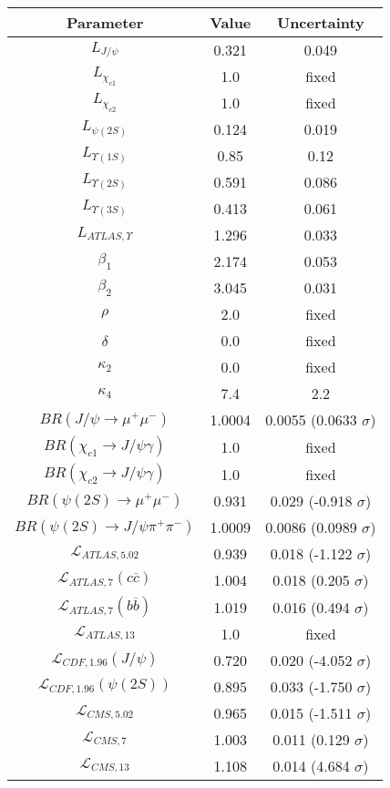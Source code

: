 \begin{table}[h!]
\centering
\begin{tabular}{c|c|c}
Parameter & Value & Uncertainty \\
\hline
$L_{J/\psi}$ & 0.321 & 0.049 \\
$L_{\chi_{c1}}$ & 1.0 & fixed \\
$L_{\chi_{c2}}$ & 1.0 & fixed \\
$L_{\psi(2S)}$ & 0.124 & 0.019 \\
$L_{\Upsilon(1S)}$ & 0.85 & 0.12 \\
$L_{\Upsilon(2S)}$ & 0.591 & 0.086 \\
$L_{\Upsilon(3S)}$ & 0.413 & 0.061 \\
$L_{ATLAS,\Upsilon}$ & 1.296 & 0.033 \\
$\beta_1$ & 2.174 & 0.053 \\
$\beta_2$ & 3.045 & 0.031 \\
$\rho$ & 2.0 & fixed \\
$\delta$ & 0.0 & fixed \\
$\kappa_2$ & 0.0 & fixed \\
$\kappa_4$ & 7.4 & 2.2 \\
$BR(J/\psi\rightarrow\mu^+\mu^-)$ & 1.0004 & 0.0055 (0.0633 $\sigma$) \\
$BR(\chi_{c1}\rightarrow J/\psi\gamma)$ & 1.0 & fixed \\
$BR(\chi_{c2}\rightarrow J/\psi\gamma)$ & 1.0 & fixed \\
$BR(\psi(2S)\rightarrow\mu^+\mu^-)$ & 0.931 & 0.029 (-0.918 $\sigma$) \\
$BR(\psi(2S)\rightarrow J/\psi\pi^+\pi^-)$ & 1.0009 & 0.0086 (0.0989 $\sigma$) \\
$\mathcal L_{ATLAS,5.02}$ & 0.939 & 0.018 (-1.122 $\sigma$) \\
$\mathcal L_{ATLAS,7}(c\overline c)$ & 1.004 & 0.018 (0.205 $\sigma$) \\
$\mathcal L_{ATLAS,7}(b\overline b)$ & 1.019 & 0.016 (0.494 $\sigma$) \\
$\mathcal L_{ATLAS,13}$ & 1.0 & fixed \\
$\mathcal L_{CDF,1.96}(J/\psi)$ & 0.720 & 0.020 (-4.052 $\sigma$) \\
$\mathcal L_{CDF,1.96}(\psi(2S))$ & 0.895 & 0.033 (-1.750 $\sigma$) \\
$\mathcal L_{CMS,5.02}$ & 0.965 & 0.015 (-1.511 $\sigma$) \\
$\mathcal L_{CMS,7}$ & 1.003 & 0.011 (0.129 $\sigma$) \\
$\mathcal L_{CMS,13}$ & 1.108 & 0.014 (4.684 $\sigma$) \\

\end{tabular}
\end{table}
